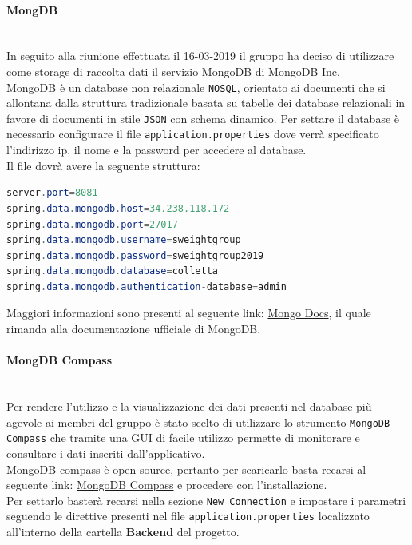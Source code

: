 \paragraph{MongDB}\mbox{}\\
In seguito alla riunione effettuata il 16-03-2019 il gruppo ha deciso di utilizzare come storage di raccolta dati il servizio MongoDB di MongoDB Inc.\\
MongoDB è un database non relazionale \texttt{NOSQL}, orientato ai documenti che si allontana dalla struttura tradizionale basata su tabelle dei database relazionali in favore di documenti in stile \texttt{JSON} con schema dinamico. 
Per settare il database è necessario configurare il file \texttt{application.properties} dove verrà specificato l'indirizzo ip, il nome e la password per accedere al database.\\
Il file dovrà avere la seguente struttura: 
\begin{lstlisting}[language=Java] 
server.port=8081
spring.data.mongodb.host=34.238.118.172
spring.data.mongodb.port=27017
spring.data.mongodb.username=sweightgroup
spring.data.mongodb.password=sweightgroup2019
spring.data.mongodb.database=colletta
spring.data.mongodb.authentication-database=admin
\end{lstlisting}
Maggiori informazioni sono presenti al seguente link: \href{https://docs.mongodb.com/?_ga=2.183391522.509639120.1554133474-1194492321.1550924275}{Mongo Docs}, il quale rimanda alla documentazione ufficiale di MongoDB. 

\paragraph{MongDB Compass}\mbox{}\\
Per rendere l'utilizzo e la visualizzazione dei dati presenti nel database più agevole ai membri del gruppo è stato scelto di utilizzare lo strumento \texttt{MongoDB Compass} che tramite una {GUI} di facile utilizzo permette di monitorare e consultare i dati inseriti dall'applicativo.\\
MongoDB compass è open source, pertanto per scaricarlo basta recarsi al seguente link: \href{https://www.mongodb.com/products/compass}{MongoDB Compass} e procedere con l'installazione.\\
Per settarlo basterà recarsi nella sezione \texttt{New  Connection} e impostare i parametri seguendo le direttive presenti nel file \texttt{application.properties} localizzato all'interno della cartella \textbf{Backend} del progetto.

